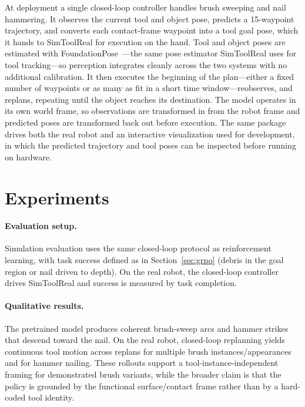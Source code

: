 \documentclass[11pt]{article}
\begin{document}
At deployment a single closed-loop controller handles brush sweeping and nail hammering.
It observes the current tool and object pose, predicts a 15-waypoint trajectory, and converts each contact-frame waypoint into a tool goal pose, which it hands to SimToolReal for execution on the hand.
Tool and object poses are estimated with FoundationPose~\cite{foundationpose}---the same pose estimator SimToolReal uses for tool tracking---so perception integrates cleanly across the two systems with no additional calibration.
It then executes the beginning of the plan---either a fixed number of waypoints or as many as fit in a short time window---reobserves, and replans, repeating until the object reaches its destination.
The model operates in its own world frame, so observations are transformed in from the robot frame and predicted poses are transformed back out before execution.
The same package drives both the real robot and an interactive visualization used for development, in which the predicted trajectory and tool poses can be inspected before running on hardware.

\section{Experiments}
\label{sec:experiments}

\paragraph{Evaluation setup.}
Simulation evaluation uses the same closed-loop protocol as reinforcement learning, with task success defined as in Section~\ref{sec:grpo} (debris in the goal region or nail driven to depth).
On the real robot, the closed-loop controller drives SimToolReal and success is measured by task completion.

\paragraph{Qualitative results.}
The pretrained model produces coherent brush-sweep arcs and hammer strikes that descend toward the nail.
On the real robot, closed-loop replanning yields continuous tool motion across replans for multiple brush instances/appearances and for hammer nailing.
These rollouts support a tool-instance-independent framing for demonstrated brush variants, while the broader claim is that the policy is grounded by the functional surface/contact frame rather than by a hard-coded tool identity.
\end{document}

